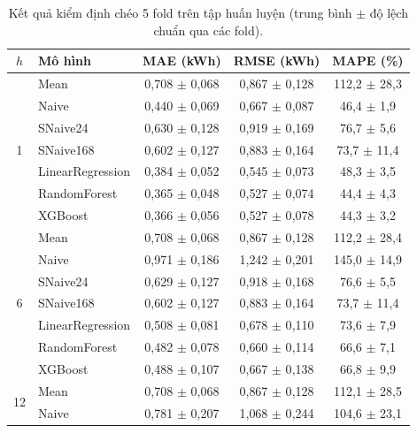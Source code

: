 \begin{table}[htbp]
\centering
\caption[Kết quả kiểm định chéo của mọi mô hình]{Kết quả kiểm định chéo 5 fold trên tập huấn luyện (trung bình $\pm$ độ lệch chuẩn qua các fold).}
\label{tab:cv_summary}
\small
\begin{tabular}{|c|l|c|c|c|}
\hline
\textbf{$h$} & \textbf{Mô hình} & \textbf{MAE (kWh)} & \textbf{RMSE (kWh)} & \textbf{MAPE (\%)} \\
\hline
\multirow{7}{*}{1} & Mean & 0{,}708 $\pm$ 0{,}068 & 0{,}867 $\pm$ 0{,}128 & 112{,}2 $\pm$ 28{,}3 \\
\cline{2-5}
 & Naive & 0{,}440 $\pm$ 0{,}069 & 0{,}667 $\pm$ 0{,}087 & 46{,}4 $\pm$ 1{,}9 \\
\cline{2-5}
 & SNaive24 & 0{,}630 $\pm$ 0{,}128 & 0{,}919 $\pm$ 0{,}169 & 76{,}7 $\pm$ 5{,}6 \\
\cline{2-5}
 & SNaive168 & 0{,}602 $\pm$ 0{,}127 & 0{,}883 $\pm$ 0{,}164 & 73{,}7 $\pm$ 11{,}4 \\
\cline{2-5}
 & LinearRegression & 0{,}384 $\pm$ 0{,}052 & 0{,}545 $\pm$ 0{,}073 & 48{,}3 $\pm$ 3{,}5 \\
\cline{2-5}
 & RandomForest & 0{,}365 $\pm$ 0{,}048 & 0{,}527 $\pm$ 0{,}074 & 44{,}4 $\pm$ 4{,}3 \\
\cline{2-5}
 & XGBoost & 0{,}366 $\pm$ 0{,}056 & 0{,}527 $\pm$ 0{,}078 & 44{,}3 $\pm$ 3{,}2 \\
\hline
\multirow{7}{*}{6} & Mean & 0{,}708 $\pm$ 0{,}068 & 0{,}867 $\pm$ 0{,}128 & 112{,}2 $\pm$ 28{,}4 \\
\cline{2-5}
 & Naive & 0{,}971 $\pm$ 0{,}186 & 1{,}242 $\pm$ 0{,}201 & 145{,}0 $\pm$ 14{,}9 \\
\cline{2-5}
 & SNaive24 & 0{,}629 $\pm$ 0{,}127 & 0{,}918 $\pm$ 0{,}168 & 76{,}6 $\pm$ 5{,}5 \\
\cline{2-5}
 & SNaive168 & 0{,}602 $\pm$ 0{,}127 & 0{,}883 $\pm$ 0{,}164 & 73{,}7 $\pm$ 11{,}4 \\
\cline{2-5}
 & LinearRegression & 0{,}508 $\pm$ 0{,}081 & 0{,}678 $\pm$ 0{,}110 & 73{,}6 $\pm$ 7{,}9 \\
\cline{2-5}
 & RandomForest & 0{,}482 $\pm$ 0{,}078 & 0{,}660 $\pm$ 0{,}114 & 66{,}6 $\pm$ 7{,}1 \\
\cline{2-5}
 & XGBoost & 0{,}488 $\pm$ 0{,}107 & 0{,}667 $\pm$ 0{,}138 & 66{,}8 $\pm$ 9{,}9 \\
\hline
\multirow{7}{*}{12} & Mean & 0{,}708 $\pm$ 0{,}068 & 0{,}867 $\pm$ 0{,}128 & 112{,}1 $\pm$ 28{,}5 \\
\cline{2-5}
 & Naive & 0{,}781 $\pm$ 0{,}207 & 1{,}068 $\pm$ 0{,}244 & 104{,}6 $\pm$ 23{,}1 \\

\end{tabular}
\end{table}
